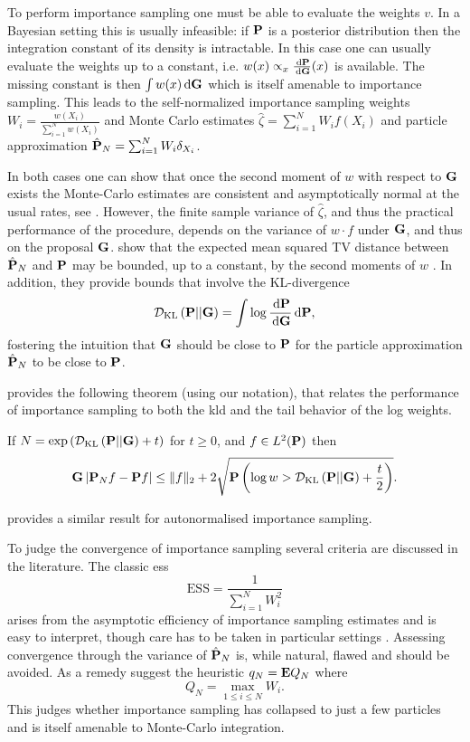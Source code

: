 To perform importance sampling one must be able to evaluate the weights $v$. In a Bayesian setting this is usually infeasible: if $\P$ is a posterior distribution then the integration constant of its density is intractable.
In this case one can usually evaluate the weights up to a constant, i.e. $w(x) \propto_x \frac{\d \P}{\d \G}(x)$ is available. The missing constant is then $\int w(x) \d \G$ which is itself amenable to importance sampling.
This leads to the self-normalized importance sampling weights $W_i = \frac{w(X_i)}{\sum_{i = 1}^N w(X_i)}$ and Monte Carlo estimates $\hat \zeta = \sum_{i = 1}^{N} W_i f(X_i)$ and particle approximation $\hat \P_N = \sum_{i = 1}^{N} W_i \delta_{X_i}$.

In both cases one can show that once the second moment of $w$ with respect to $\G$ exists the Monte-Carlo estimates are consistent and asymptotically normal at the usual rates, see \cite[Chapter 8]{Chopin2020Introduction}. 
However, the finite sample variance of $\hat\zeta$, and thus the practical performance of the procedure, depends on the variance of $w\cdot f$ under $\G$, and thus on the proposal $\G$. \cite{Agapiou2017Importance} show that  the expected mean squared TV distance  between $\hat \P_N$ and  $\P$ may be bounded, up to a constant, by the second moments of $w$ . In addition, they provide bounds that involve the KL-divergence 
$$
\Dkl{\P}{\G} = \int \log \frac{\d \P}{\d \G} \d \P,
$$
fostering the intuition that $\G$ should be close to $\P$ for the particle approximation $\hat\P_{N}$ to be close to $\P$.

\cite{Chatterjee2018Sample} provides the following theorem (using our notation), that relates the performance of importance sampling to both the \gls{kld} and the tail behavior of the log weights.
\begin{theorem}
    \label{thm:chatterje2018Thm1}
    If $N = \exp \left( \Dkl{\P}{\G} + t \right)$ for $ t\geq 0$, and $f \in L^{2}(\P)$ then
    $$
        \G \left\lvert \P_{N} f - \P f \right\rvert \leq \lVert f \rVert_{2} + 2 \sqrt{ \P \left( \log w > \Dkl{\P}{\G} + \frac{t}{2} \right)}.
    $$
\end{theorem}
\citep[Theorem 1.2]{Chatterjee2018Sample} provides a similar result for autonormalised importance sampling.

To judge the convergence of importance sampling several criteria are discussed in the literature. The classic \gls{ess}\cite{Kong1994Sequential} 
$$
\text{ESS} = \frac{1}{\sum_{i = 1}^N W^{2}_{i}}
$$
arises from the asymptotic efficiency of importance sampling estimates and is easy to interpret, though care has to be taken in particular settings . Assessing convergence through the variance of $\hat \P_{N}$ is, while natural, flawed \cite{Chatterjee2018Sample} and should be avoided. As a remedy \cite{Chatterjee2018Sample} suggest the heuristic $q_{N} = \E Q_{N}$ where
$$
Q_{N} = \max_{1\leq i\leq N} W_{i}.
$$
This judges whether importance sampling has collapsed to just a few particles and is itself amenable to Monte-Carlo integration.

